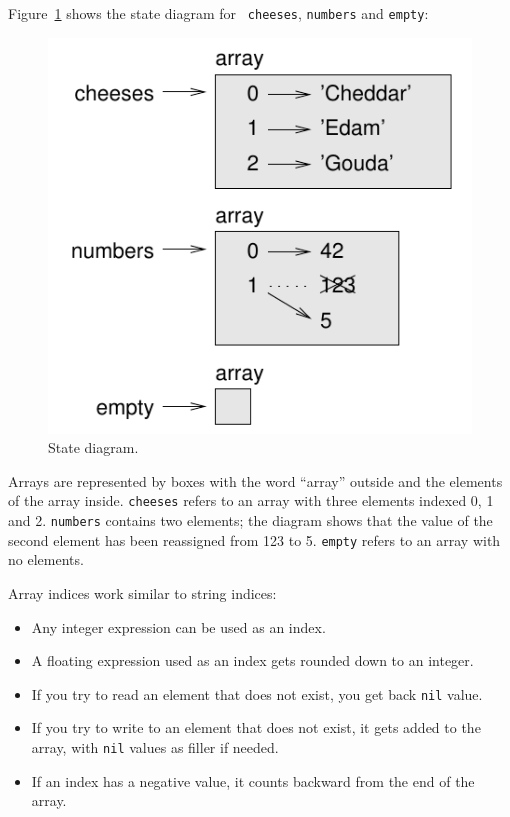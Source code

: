 \documentclass[10pt]{book}
\begin{document}
Figure~\ref{fig.liststate} shows 
the state diagram for {\tt
cheeses}, {\tt numbers} and {\tt empty}:

\begin{figure}
\centerline
{\includegraphics[scale=0.8]{figs/liststate.pdf}}
\caption{State diagram.}
\label{fig.liststate}
\end{figure}

Arrays are represented by boxes with the word ``array'' outside
and the elements of the array inside.  {\tt cheeses} refers to
an array with three elements indexed 0, 1 and 2.
{\tt numbers} contains two elements; the diagram shows that the
value of the second element has been reassigned from 123 to 5.
{\tt empty} refers to an array with no elements.

Array indices work similar to string indices:

\begin{itemize}

\item Any integer expression can be used as an index.

\item A floating expression used as an index gets rounded
down to an integer.

\item If you try to read an element that does not exist, you
get back {\tt nil} value.

\item If you try to write to an element that does not exist, it
gets added to the array, with {\tt nil} values as filler if needed.

\item If an index has a negative value, it counts backward from the
end of the array.

\end{itemize}
\end{document}
